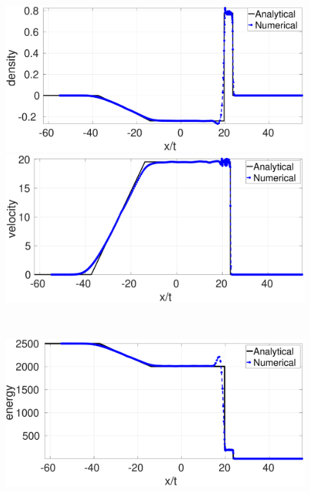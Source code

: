 \begin{figure}[H]
    \centering
    \begin{minipage}{.495\textwidth}
        \centering
        \includegraphics[width=0.99 \textwidth]{Chapter-4/Figures/strong-blast/StrBlst-RCM-rho-Rp3}
    \end{minipage}%
    \begin{minipage}{.495 \textwidth}
        \centering
        \includegraphics[width=0.99 \textwidth]{Chapter-4/Figures/strong-blast/StrBlst-RCM-v-Rp3}
    \end{minipage}%
    \\
    \begin{minipage}{.495 \textwidth}
        \centering
        \includegraphics[width=0.99 \textwidth]{Chapter-4/Figures/strong-blast/StrBlst-RCM-e-Rp3}

\end{minipage}
\end{figure}
